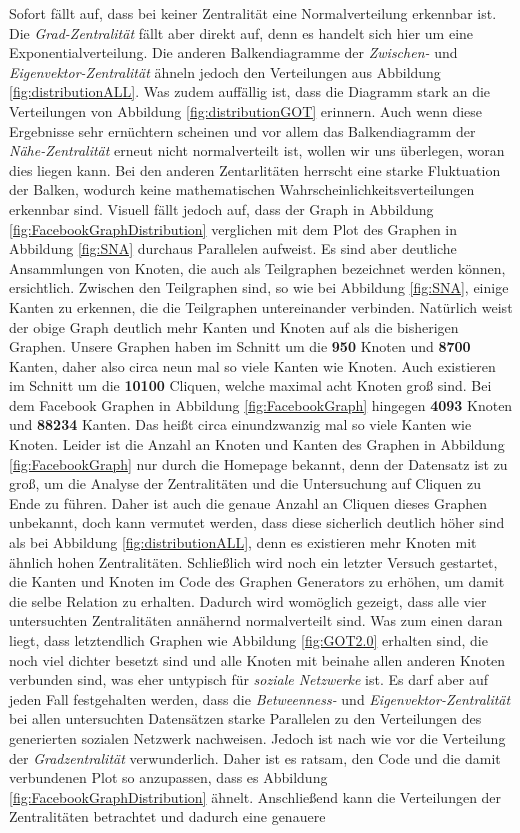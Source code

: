 Sofort fällt auf, dass bei keiner Zentralität eine Normalverteilung erkennbar ist. Die \textit{Grad-Zentralität} fällt aber direkt auf, denn es handelt sich hier um eine Exponentialverteilung. Die anderen Balkendiagramme der \textit{Zwischen-} und \textit{Eigenvektor-Zentralität} ähneln jedoch den Verteilungen aus Abbildung \ref{fig:distributionALL}. Was zudem auffällig ist, dass die Diagramm stark an die Verteilungen von Abbildung \ref{fig:distributionGOT} erinnern. Auch wenn diese Ergebnisse sehr ernüchtern scheinen und vor allem das Balkendiagramm der \textit{Nähe-Zentralität} erneut nicht normalverteilt ist, wollen wir uns überlegen, woran dies liegen kann. Bei den anderen Zentarlitäten herrscht eine starke Fluktuation der Balken, wodurch keine mathematischen Wahrscheinlichkeitsverteilungen erkennbar sind. Visuell fällt jedoch auf, dass der Graph in Abbildung \ref{fig:FacebookGraphDistribution} verglichen mit dem Plot des Graphen in Abbildung \ref{fig:SNA} durchaus Parallelen aufweist. Es sind aber deutliche Ansammlungen von Knoten, die auch als Teilgraphen bezeichnet werden können, ersichtlich. Zwischen den Teilgraphen sind, so wie bei Abbildung \ref{fig:SNA}, einige Kanten zu erkennen, die die Teilgraphen untereinander verbinden. Natürlich weist der obige Graph deutlich mehr Kanten und Knoten auf als die bisherigen Graphen. Unsere Graphen haben im Schnitt um die \textbf{950} Knoten und \textbf{8700} Kanten, daher also circa neun mal so viele Kanten wie Knoten. Auch existieren im Schnitt um die \textbf{10100} Cliquen, welche maximal acht Knoten groß sind. Bei dem Facebook Graphen in Abbildung \ref{fig:FacebookGraph} hingegen \textbf{4093} Knoten und \textbf{88234} Kanten. Das heißt circa einundzwanzig mal so viele Kanten wie Knoten. Leider ist die Anzahl an Knoten und Kanten des Graphen in Abbildung \ref{fig:FacebookGraph} nur durch die Homepage \cite{FBData} bekannt, denn der Datensatz ist zu groß, um die Analyse der Zentralitäten und die Untersuchung auf Cliquen zu Ende zu führen. Daher ist auch die genaue Anzahl an Cliquen dieses Graphen unbekannt, doch kann vermutet werden, dass diese sicherlich deutlich höher sind als bei Abbildung \ref{fig:distributionALL}, denn es existieren mehr Knoten mit ähnlich hohen Zentralitäten. Schließlich wird noch ein letzter Versuch gestartet, die Kanten und Knoten im Code des Graphen Generators zu erhöhen, um damit die selbe Relation zu erhalten. Dadurch wird womöglich gezeigt, dass alle vier untersuchten Zentralitäten annähernd normalverteilt sind. Was zum einen daran liegt, dass letztendlich Graphen wie Abbildung \ref{fig:GOT2.0} erhalten sind, die noch viel dichter besetzt sind und alle Knoten mit beinahe allen anderen Knoten verbunden sind, was eher untypisch für \textit{soziale Netzwerke} ist. Es darf aber auf jeden Fall festgehalten werden, dass die \textit{Betweenness-} und \textit{Eigenvektor-Zentralität} bei allen untersuchten Datensätzen starke Parallelen zu den Verteilungen des generierten sozialen Netzwerk nachweisen. Jedoch ist nach wie vor die Verteilung der \textit{Gradzentralität} verwunderlich. Daher ist es ratsam, den Code und die damit verbundenen Plot so anzupassen, dass es Abbildung \ref{fig:FacebookGraphDistribution} ähnelt. Anschließend kann die Verteilungen der Zentralitäten betrachtet und dadurch eine genauere 